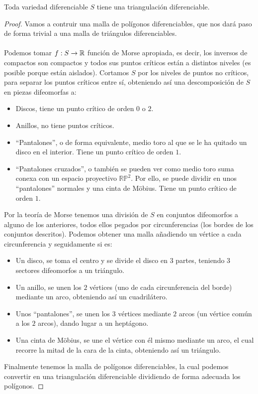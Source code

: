 \begin{hecho}
	Toda variedad diferenciable $S$ tiene una triangulación diferenciable.
\end{hecho}

\begin{proof}
	Vamos a contruir una malla de polígonos diferenciables, que nos dará paso de forma trivial a una malla de triángulos diferenciables.\\
	\\ Podemos tomar $f:S \rightarrow \mathbb{R}$ función de Morse apropiada, es decir, los inversos de compactos son compactos y todos sus puntos críticos están a distintos niveles (es posible porque están aislados). Cortamos $S$ por los niveles de puntos no críticos, para separar los puntos críticos entre sí, obteniendo así una descomposición de $S$ en piezas difeomorfas a:
	\begin{itemize}
		\item Discos, tiene un punto crítico de orden $0$ o $2$.
		\item Anillos, no tiene puntos críticos.
		\item ``Pantalones'', o de forma equivalente, medio toro al que se le ha quitado un disco en el interior. Tiene un punto crítico de orden $1$.
		\item ``Pantalones cruzados'', o también se pueden ver como medio toro suma conexa con un espacio proyectivo $\mathbb{RP}^2$. Por ello, se puede dividir en unos ``pantalones'' normales y una cinta de Möbius. Tiene un punto crítico de orden $1$.
	\end{itemize} 
	
	Por la teoría de Morse tenemos una división de $S$ en conjuntos difeomorfos a alguno de los anteriores, todos ellos pegados por circunferencias (los bordes de los conjuntos descritos). Podemos obtener una malla añadiendo un vértice a cada circunferencia y seguidamente si es:
	\begin{itemize}
		\item Un disco, se toma el centro y se divide el disco en $3$ partes, teniendo $3$ sectores difeomorfos a un triángulo.
		\item Un anillo, se unen los $2$ vértices (uno de cada circunferencia del borde) mediante un arco, obteniendo así un cuadrilátero.
		\item Unos ``pantalones'', se unen los $3$ vértices mediante $2$ arcos (un vértice común a los $2$ arcos), dando lugar a un heptágono.
		\item Una cinta de Möbius, se une el vértice con él mismo mediante un arco, el cual recorre la mitad de la cara de la cinta, obteniendo así un triángulo.
	\end{itemize} 
	
	Finalmente tenemos la malla de polígonos diferenciables, la cual podemos convertir en una triangulación diferenciable dividiendo de forma adecuada los polígonos.
\end{proof}

